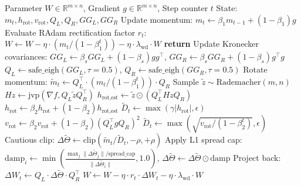 \documentclass[11pt,a4paper]{article}
\begin{document}
\begin{algorithm}[h!]
\caption{RACASO Step Procedure (2-D Parameter)}
\label{alg:racaso}
\begin{algorithmic}[1]
\Require Parameter $W \in \mathbb{R}^{m \times n}$, Gradient $g \in \mathbb{R}^{m \times n}$, Step counter $t$
\Require State: $m_t, h_{\text{rot}}, v_{\text{rot}}, Q_L, Q_R, GG_L, GG_R$
\State Update momentum: $m_t \gets \beta_1 m_{t-1} + (1 - \beta_1) g$
\State Evaluate RAdam rectification factor $r_t$:
    \State $W \gets W - \eta \cdot (m_t / (1 - \beta_1^t)) - \eta \cdot \lambda_{\text{wd}} \cdot W$ 
    \State \textbf{return}
\EndIf
\State Update Kronecker covariances: $GG_L \gets \beta_s GG_L + (1 - \beta_s) g g^\top$, $GG_R \gets \beta_s GG_R + (1 - \beta_s) g^\top g$
    \State $Q_L \gets \text{safe\_eigh}(GG_L, \tau=0.5)$, \quad $Q_R \gets \text{safe\_eigh}(GG_R, \tau=0.5)$ 
\EndIf
\State Rotate momentum: $\tilde{m}_t \gets Q_L^\top \cdot (m_t / (1 - \beta_1^t)) \cdot Q_R$
        \State Sample $\tilde{z} \sim \text{Rademacher}(m, n)$
        \State $Hz \gets \text{jvp}(\nabla f, Q_L \tilde{z} Q_R^\top)$
        \State $h_{\text{rot,est}} \gets \tilde{z} \odot (Q_L^\top Hz Q_R)$
         
            \State $h_{\text{rot}} \gets \beta_2 h_{\text{rot}} + (1 - \beta_2) h_{\text{rot,est}}$
        \EndIf
    \EndIf
    \State $\tilde{D}_t \gets \max(\gamma |h_{\text{rot}}|, \epsilon)$
\Else {}
    \State $v_{\text{rot}} \gets \beta_2 v_{\text{rot}} + (1 - \beta_2) (Q_L^\top g Q_R)^2$
    \State $\tilde{D}_t \gets \max(\sqrt{v_{\text{rot}} / (1 - \beta_2^t)}, \epsilon)$
\EndIf
\State Cautious clip: $\Delta \tilde{\Theta} \gets \text{clip}(\tilde{m}_t / \tilde{D}_t, -\rho, +\rho)$
\State Apply L1 spread cap: $\text{damp}_i \gets \min\left(\frac{\max_j \|\Delta \tilde{\Theta}_j\| / \text{spread\_cap}}{\|\Delta \tilde{\Theta}_i\|}, 1.0\right)$, \quad $\Delta \tilde{\Theta} \gets \Delta \tilde{\Theta} \odot \text{damp}$
\State Project back: $\Delta W_t \gets Q_L \cdot \Delta \tilde{\Theta} \cdot Q_R^\top$
    \State $W \gets W - \eta \cdot r_t \cdot \Delta W_t - \eta \cdot \lambda_{\text{wd}} \cdot W$
\EndIf
\end{algorithmic}
\end{algorithm}
\end{document}
